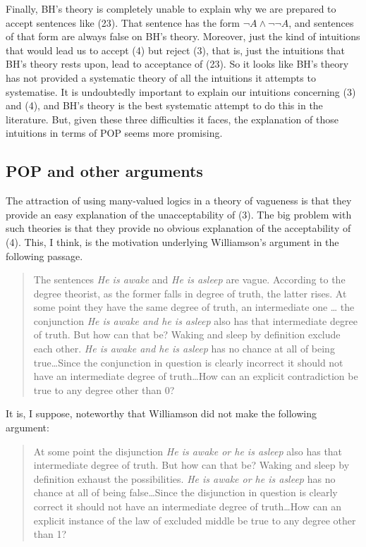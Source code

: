 Finally, BH's theory is completely unable to explain why we are prepared to accept sentences like (23). That sentence has the form \(\neg A \wedge \neg \neg A\), and sentences of that form are always false on BH's theory. Moreover, just the kind of intuitions that would lead us to accept (4) but reject (3), that is, just the intuitions that BH's theory rests upon, lead to acceptance of (23). So it looks like BH's theory has not provided a systematic theory of all the intuitions it attempts to systematise. It is undoubtedly important to explain our intuitions concerning (3) and (4), and BH's theory is the best systematic attempt to do this in the literature. But, given these three difficulties it faces, the explanation of those intuitions in terms of POP seems more promising.


\subsection{POP and other arguments}

The attraction of using many-valued logics in a theory of vagueness is that they provide an easy explanation of the unacceptability of (3). The big problem with such theories is that they provide no obvious explanation of the acceptability of (4). This, I think, is the motivation underlying Williamson's argument in the following passage.

\begin{quote}
The sentences \textit{He is awake} and \textit{He is asleep} are vague. According to the degree theorist, as the former falls in degree of truth, the latter rises. At some point they have the same degree of truth, an intermediate one {\dots} the conjunction \textit{He is awake and he is asleep} also has that intermediate degree of truth. But how can that be? Waking and sleep by definition exclude each other. \textit{He is awake and he is asleep} has no chance at all of being true{\dots}Since the conjunction in question is clearly incorrect it should not have an intermediate degree of truth{\dots}How can an explicit contradiction be true to any degree other than 0? \citeyearpar[136]{Williamson1994-WILV}
\end{quote}

\noindent It is, I suppose, noteworthy that Williamson did not make the following argument:

\begin{quote}
At some point the disjunction \textit{He is awake or he is asleep} also has that intermediate degree of truth. But how can that be? Waking and sleep by definition exhaust the possibilities. \textit{He is awake or he is asleep} has no chance at all of being false{\dots}Since the disjunction in question is clearly correct it should not have an intermediate degree of truth{\dots}How can an explicit instance of the law of excluded middle be true to any degree other than 1?
\end{quote}

